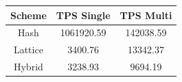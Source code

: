 \begin{tabular}{ccc}
\hline
Scheme & TPS Single & TPS Multi \\
\hline
Hash & 1061920.59 & 142038.59 \\
Lattice & 3400.76 & 13342.37 \\
Hybrid & 3238.93 & 9694.19 \\
\hline
\end{tabular}
